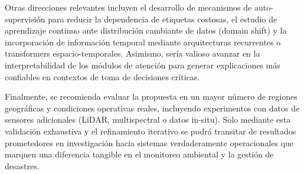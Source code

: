 Otras direcciones relevantes incluyen el desarrollo de mecanismos de auto-supervisión para reducir la dependencia de etiquetas costosas, el estudio de aprendizaje continuo ante distribución cambiante de datos (domain shift) y la incorporación de información temporal mediante arquitecturas recurrentes o transformers espacio-temporales. Asimismo, sería valioso avanzar en la interpretabilidad de los módulos de atención para generar explicaciones más confiables en contextos de toma de decisiones críticas.

Finalmente, se recomienda evaluar la propuesta en un mayor número de regiones geográficas y condiciones operativas reales, incluyendo experimentos con datos de sensores adicionales (LiDAR, multispectral o datos in-situ). Solo mediante esta validación exhaustiva y el refinamiento iterativo se podrá transitar de resultados prometedores en investigación hacia sistemas verdaderamente operacionales que marquen una diferencia tangible en el monitoreo ambiental y la gestión de desastres.